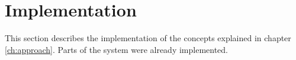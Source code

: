 \chapter{Implementation}
\label{ch:implementation}



This section describes the implementation of the concepts explained in chapter \ref{ch:approach}.
Parts of the system were already implemented.





	